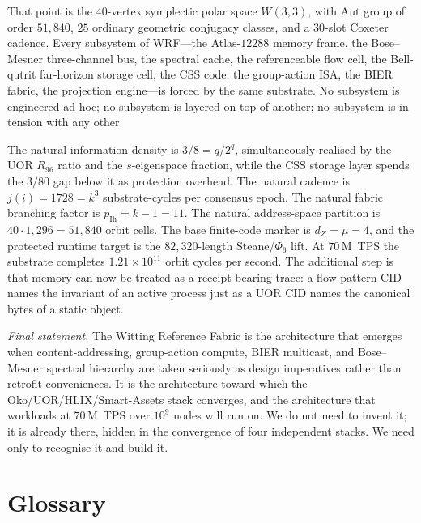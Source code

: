 \documentclass[11pt,letterpaper]{article}
\theoremstyle{remark}
\newcommand{\W}{W(3,3)}
\newcommand{\Aut}{\mathrm{Aut}}
\begin{document}
That point is the $40$-vertex symplectic polar space $\W$, with $\Aut$ group of order
$51{,}840$, $25$ ordinary geometric conjugacy classes, and a $30$-slot Coxeter cadence.
Every subsystem of WRF---the Atlas-$12288$
memory frame, the Bose--Mesner three-channel bus, the spectral cache, the referenceable
flow cell, the Bell-qutrit far-horizon storage cell, the CSS code, the group-action ISA,
the BIER fabric, the projection
engine---is forced by the same substrate. No subsystem is engineered ad hoc; no
subsystem is layered on top of another; no subsystem is in tension with any other.

The natural information density is $3/8 = q/2^q$, simultaneously realised by the UOR
$R_{96}$ ratio and the $s$-eigenspace fraction, while the CSS storage layer spends the
$3/80$ gap below it as protection overhead. The natural cadence is
$j(i) = 1728 = k^3$ substrate-cycles per consensus epoch. The natural fabric branching
factor is $p_{\mathrm{Ih}} = k - 1 = 11$. The natural address-space partition is
$40 \cdot 1{,}296 = 51{,}840$ orbit cells. The base finite-code marker is $d_Z=\mu=4$,
and the protected runtime target is the $82{,}320$-length Steane/$\Phi_6$ lift. At
$70$\,M~TPS the substrate completes $1.21 \times 10^{11}$ orbit cycles per second.
The additional step is that memory can now be treated as a receipt-bearing trace: a
flow-pattern CID names the invariant of an active process just as a UOR CID names the
canonical bytes of a static object.

\begin{thesis}
\textit{Final statement.} The Witting Reference Fabric is the architecture that emerges when
content-addressing, group-action compute, BIER multicast, and Bose--Mesner spectral
hierarchy are taken seriously as design imperatives rather than retrofit conveniences. It
is the architecture toward which the Oko/UOR/HLIX/Smart-Assets stack converges, and the
architecture that workloads at $70$\,M~TPS over $10^9$ nodes will run on. We do not need to
invent it; it is already there, hidden in the convergence of four independent stacks. We
need only to recognise it and build it.
\end{thesis}

\appendix
\section{Glossary}
\end{document}
